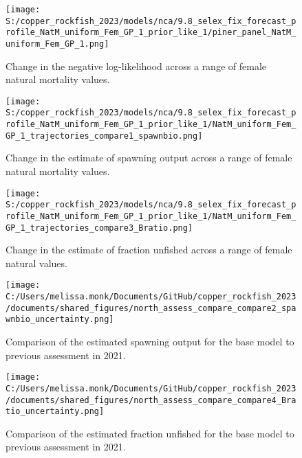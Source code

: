 \documentclass[
  letterpaper,
]{article}
\begin{document}
\pagebreak

\begin{figure}
\centering
\texttt{[image: S:/copper\_rockfish\_2023/models/nca/9.8\_selex\_fix\_forecast\_profile\_NatM\_uniform\_Fem\_GP\_1\_prior\_like\_1/piner\_panel\_NatM\_uniform\_Fem\_GP\_1.png]}
\caption{Change in the negative log-likelihood across a range of female natural mortality values.\label{fig:m-profile}}
\end{figure}

\pagebreak

\begin{figure}
\centering
\texttt{[image: S:/copper\_rockfish\_2023/models/nca/9.8\_selex\_fix\_forecast\_profile\_NatM\_uniform\_Fem\_GP\_1\_prior\_like\_1/NatM\_uniform\_Fem\_GP\_1\_trajectories\_compare1\_spawnbio.png]}
\caption{Change in the estimate of spawning output across a range of female natural mortality values.\label{fig:m-ssb}}
\end{figure}

\pagebreak

\begin{figure}
\centering
\texttt{[image: S:/copper\_rockfish\_2023/models/nca/9.8\_selex\_fix\_forecast\_profile\_NatM\_uniform\_Fem\_GP\_1\_prior\_like\_1/NatM\_uniform\_Fem\_GP\_1\_trajectories\_compare3\_Bratio.png]}
\caption{Change in the estimate of fraction unfished across a range of female natural values.\label{fig:m-depl}}
\end{figure}

\begin{figure}
\centering
\texttt{[image: C:/Users/melissa.monk/Documents/GitHub/copper\_rockfish\_2023/documents/shared\_figures/north\_assess\_compare\_compare2\_spawnbio\_uncertainty.png]}
\caption{Comparison of the estimated spawning output for the base model to previous assessment in 2021.\label{fig:comp-assess-sb}}
\end{figure}

\newpage

\begin{figure}
\centering
\texttt{[image: C:/Users/melissa.monk/Documents/GitHub/copper\_rockfish\_2023/documents/shared\_figures/north\_assess\_compare\_compare4\_Bratio\_uncertainty.png]}
\caption{Comparison of the estimated fraction unfished for the base model to previous assessment in 2021.\label{fig:comp-assess-depl}}
\end{figure}
\end{document}

